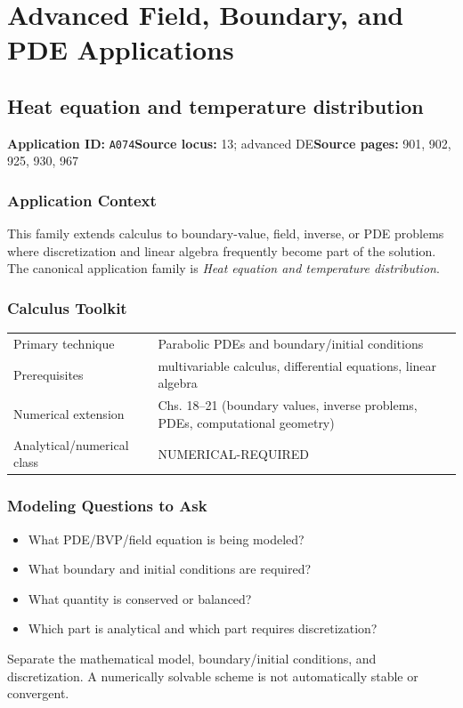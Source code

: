 \documentclass[11pt]{book}
\newcommand{\pid}[1]{\texttt{#1}}
\begin{document}
\part{Advanced Field, Boundary, and PDE Applications}
\chapter{Heat equation and temperature distribution}\label{app:A074}
\textbf{Application ID:} \pid{A074}\quad \textbf{Source locus:} 13; advanced DE\quad \textbf{Source pages:} 901, 902, 925, 930, 967
\section*{Application Context}
This family extends calculus to boundary-value, field, inverse, or PDE problems where discretization and linear algebra frequently become part of the solution. The canonical application family is \emph{Heat equation and temperature distribution}.
\section*{Calculus Toolkit}
\begin{tabularx}{\textwidth}{@{}lX@{}}\toprule
Primary technique & Parabolic PDEs and boundary/initial conditions \\
Prerequisites & multivariable calculus, differential equations, linear algebra \\
Numerical extension & Chs. 18–21 (boundary values, inverse problems, PDEs, computational geometry) \\
Analytical/numerical class & NUMERICAL-REQUIRED \\
\bottomrule\end{tabularx}
\section*{Modeling Questions to Ask}\begin{itemize}
\item What PDE/BVP/field equation is being modeled?
\item What boundary and initial conditions are required?
\item What quantity is conserved or balanced?
\item Which part is analytical and which part requires discretization?
\end{itemize}
\begin{errorbox}Separate the mathematical model, boundary/initial conditions, and discretization. A numerically solvable scheme is not automatically stable or convergent.\end{errorbox}
\end{document}
